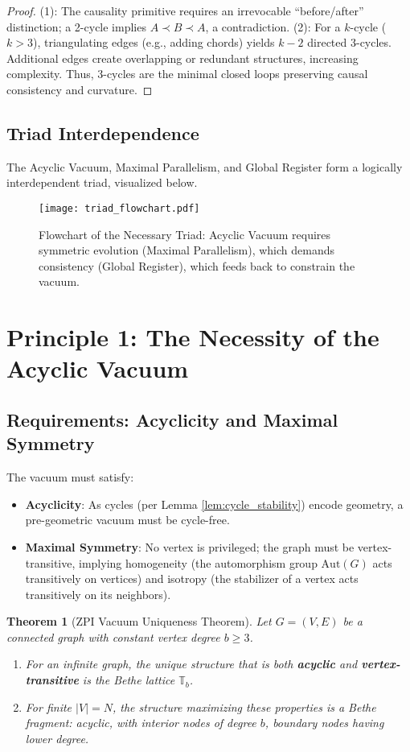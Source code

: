 \documentclass[11pt, a4paper]{article}
\newtheorem{theorem}{Theorem}[section]
\begin{document}
\begin{proof}
(1): The causality primitive requires an irrevocable “before/after” distinction; a 2-cycle implies $A \prec B \prec A$, a contradiction.  
(2): For a $k$-cycle ($k > 3$), triangulating edges (e.g., adding chords) yields $k-2$ directed 3-cycles. Additional edges create overlapping or redundant structures, increasing complexity. Thus, 3-cycles are the minimal closed loops preserving causal consistency and curvature.
\end{proof}

\subsection{Triad Interdependence}
The Acyclic Vacuum, Maximal Parallelism, and Global Register form a logically interdependent triad, visualized below.

\begin{figure}[h!]
  \centering
  \texttt{[image: triad\_flowchart.pdf]} %
  \caption{Flowchart of the Necessary Triad: Acyclic Vacuum requires symmetric evolution (Maximal Parallelism), which demands consistency (Global Register), which feeds back to constrain the vacuum.}
  \label{fig:triad_flow}
\end{figure}

\section{Principle 1: The Necessity of the Acyclic Vacuum}

\subsection{Requirements: Acyclicity and Maximal Symmetry}
The vacuum must satisfy:
\begin{itemize}
  \item \textbf{Acyclicity}: As cycles (per Lemma \ref{lem:cycle_stability}) encode geometry, a pre-geometric vacuum must be cycle-free.
  \item \textbf{Maximal Symmetry}: No vertex is privileged; the graph must be vertex-transitive, implying homogeneity (the automorphism group $\mathrm{Aut}(G)$ acts transitively on vertices) and isotropy (the stabilizer of a vertex acts transitively on its neighbors).
\end{itemize}

\begin{theorem}[ZPI Vacuum Uniqueness Theorem]
\label{thm:vacuum_uniqueness}
Let $G=(V,E)$ be a connected graph with constant vertex degree $b \geq 3$.
\begin{enumerate}
  \item For an infinite graph, the unique structure that is both \textbf{acyclic} and \textbf{vertex-transitive} is the Bethe lattice $\mathbb{T}_b$.
  \item For finite $|V| = N$, the structure maximizing these properties is a Bethe fragment: acyclic, with interior nodes of degree $b$, boundary nodes having lower degree.
\end{enumerate}
\end{theorem}
\end{document}
